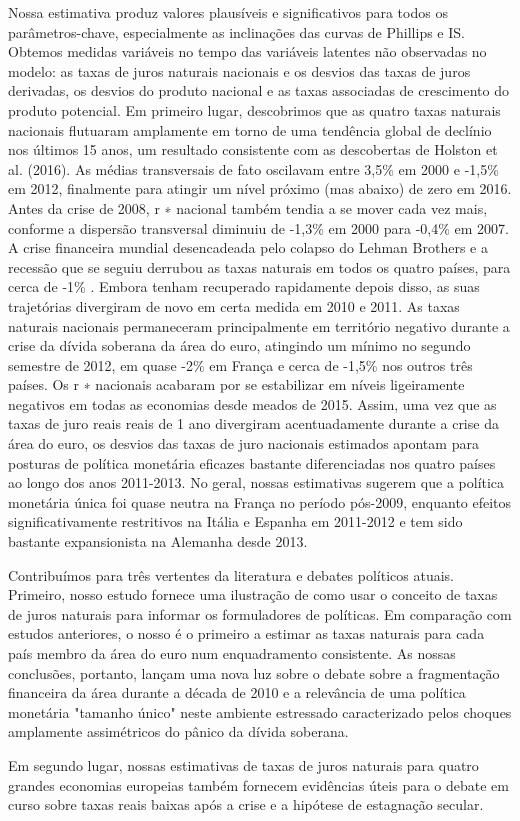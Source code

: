 Nossa estimativa produz valores plausíveis e significativos para todos os parâmetros-chave, especialmente as inclinações das curvas de Phillips e IS. Obtemos medidas variáveis no tempo das variáveis latentes não observadas no modelo: as taxas de juros naturais nacionais e os desvios das taxas de juros derivadas, os desvios do produto nacional e as taxas associadas de crescimento do produto potencial. Em primeiro lugar, descobrimos que as quatro taxas naturais nacionais flutuaram amplamente em torno de uma tendência global de declínio nos últimos 15 anos, um resultado consistente com as descobertas de Holston et al. (2016). As médias transversais de fato oscilavam entre 3,5\% em 2000 e -1,5\% em 2012, finalmente para atingir um nível próximo (mas abaixo) de zero em 2016. Antes da crise de 2008, r ∗ nacional também tendia a se mover cada vez mais, conforme a dispersão transversal diminuiu de -1,3\% em 2000 para -0,4\% em 2007. A crise financeira mundial desencadeada pelo colapso do Lehman Brothers e a recessão que se seguiu derrubou as taxas naturais em todos os quatro países, para cerca de -1\% . Embora tenham recuperado rapidamente depois disso, as suas trajetórias divergiram de novo em certa medida em 2010 e 2011. As taxas naturais nacionais permaneceram principalmente em território negativo durante a crise da dívida soberana da área do euro, atingindo um mínimo no segundo semestre de 2012, em quase -2\% em França e cerca de -1,5\% nos outros três países. Os r ∗ nacionais acabaram por se estabilizar em níveis ligeiramente negativos em todas as economias desde meados de 2015. Assim, uma vez que as taxas de juro reais reais de 1 ano divergiram acentuadamente durante a crise da área do euro, os desvios das taxas de juro nacionais estimados apontam para posturas de política monetária eficazes bastante diferenciadas nos quatro países ao longo dos anos 2011-2013. No geral, nossas estimativas sugerem que a política monetária única foi quase neutra na França no período pós-2009, enquanto
efeitos significativamente restritivos na Itália e Espanha em 2011-2012 e tem sido bastante expansionista na Alemanha desde 2013.

Contribuímos para três vertentes da literatura e debates políticos atuais. Primeiro, nosso estudo fornece uma ilustração de como usar o conceito de taxas de juros naturais para informar os formuladores de políticas. Em comparação com estudos anteriores, o nosso é o primeiro a estimar as taxas naturais para cada país membro da área do euro num enquadramento consistente. As nossas conclusões, portanto, lançam uma nova luz sobre o debate sobre a fragmentação financeira da área durante a década de 2010 e a relevância de uma política monetária "tamanho único" neste ambiente estressado caracterizado pelos choques amplamente assimétricos do pânico da dívida soberana.

Em segundo lugar, nossas estimativas de taxas de juros naturais para quatro grandes economias europeias também fornecem evidências úteis para o debate em curso sobre taxas reais baixas após a crise e a hipótese de estagnação secular.